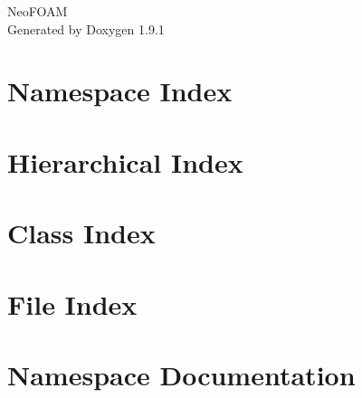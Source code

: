 \let\mypdfximage\pdfximage\def\pdfximage{\immediate\mypdfximage}\documentclass[twoside]{book}
\newcommand{\+}{\discretionary{\mbox{\scriptsize$\hookleftarrow$}}{}{}}
\newcommand{\clearemptydoublepage}{%
  \newpage{\pagestyle{empty}\cleardoublepage}%
}
\begin{document}
\raggedbottom

\hypersetup{pageanchor=false,
             bookmarksnumbered=true,
             pdfencoding=unicode
            }
\begin{titlepage}
\vspace*{7cm}
\begin{center}%
{\Large Neo\+FOAM }\\
\vspace*{1cm}
{\large Generated by Doxygen 1.9.1}\\
\end{center}
\end{titlepage}
\clearemptydoublepage
{}
\tableofcontents
\clearemptydoublepage
{}
\hypersetup{pageanchor=true}

\chapter{Namespace Index}

\chapter{Hierarchical Index}

\chapter{Class Index}

\chapter{File Index}

\chapter{Namespace Documentation}








\end{document}
